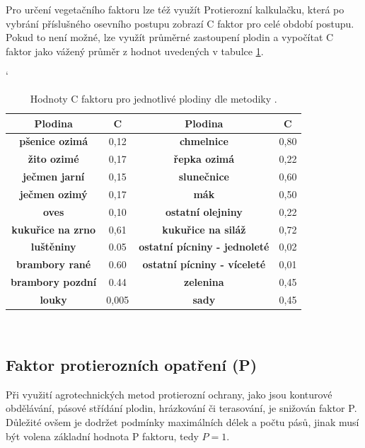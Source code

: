 Pro určení vegetačního faktoru lze též využít Protierozní kalkulačku\cite{kalkulacka}, která po vybrání příslušného osevního postupu zobrazí C faktor pro celé období postupu.
Pokud to není možné, lze využít průměrné zastoupení plodin a vypočítat C faktor jako vážený průměr z hodnot uvedených v tabulce \ref{tabulka_c}.
\begin{table}[!h]
\begin{center}
\catcode`
    \noindent\begin{tabular}{|*{4}{c|}}
\hline
\bf Plodina 		& \bf C & \bf Plodina & \bf C\\
\hline
\bf pšenice ozimá 	&0,12  &\bf chmelnice			&0,80\\
   \hline                                   
\bf žito ozimé 		&0,17  &\bf řepka ozimá			&0,22\\
   \hline                        
\bf ječmen jarní 	&0,15  &\bf slunečnice			&0,60\\
   \hline                              
\bf ječmen ozimý	&0,17  &\bf mák					&0,50\\
   \hline                              
\bf oves			&0,10  &\bf ostatní olejniny	&0,22\\
   \hline                              
\bf kukuřice na zrno&0,61  &\bf kukuřice na siláž	&0,72\\
   \hline                                   
\bf luštěniny		&0.05  &\bf ostatní pícniny - jednoleté&0,02\\
   \hline                                   
\bf brambory rané	&0.60  &\bf ostatní pícniny - víceleté &0,01\\
   \hline                                   
\bf brambory pozdní	&0.44  &\bf zelenina			&0,45\\
   \hline                                   
\bf louky			&0,005  &\bf sady				&0,45\\
   \hline                                                      
    \end{tabular}\\
  \caption[Hodnoty C faktoru pro jednotlivé plodiny]{Hodnoty C faktoru pro jednotlivé plodiny dle metodiky \cite{janecek2012}.}
  \label{tabulka_c}
\end{center}
\end{table}
\FloatBarrier
\subsection{Faktor protierozních opatření (P)}
Při využití agrotechnických metod protierozní ochrany, jako jsou konturové obdělávání, pásové střídání plodin, hrázkování či terasování, je snižován faktor P. Důležité ovšem je dodržet podmínky maximálních délek a počtu pásů, jinak musí být volena základní hodnota P faktoru, tedy $P=1$.

